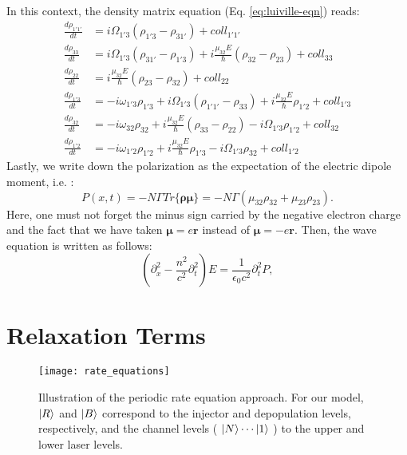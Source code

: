 \documentclass[10pt,english,fleqn]{article}%
\newcommand{\mb}[1]{\bm{#1}}
\begin{document}
\\\\
In this context, the density matrix equation (Eq. \ref{eq:luiville-eqn}) reads: 
\begin{align}
\frac{d \rho_{1'1'}}{d t} &= i\Omega_{1'3} (\rho_{1'3} - \rho_{31'}) + coll_{1'1'} \\ 
\frac{d \rho_{33}}{d t}   &= i\Omega_{1'3} (\rho_{31'} - \rho_{1'3}) + i\frac{\mu_{32} E}{\hbar} (\rho_{32}-\rho_{23}) + coll_{33} \\
\frac{d \rho_{22}}{d t}   &= i\frac{\mu_{32} E}{\hbar} (\rho_{23}-\rho_{32}) + coll_{22} \\
\frac{d \rho_{1'3}}{d t}  &= -i\omega_{1'3}\rho_{1'3} +i \Omega_{1'3}(\rho_{1'1'} - \rho_{33}) +i\frac{\mu_{32}E}{\hbar}\rho_{1'2} +coll_{1'3}  \\
\frac{d \rho_{32}}{d t}   &= -i\omega_{32}\rho_{32} +i \frac{\mu_{32}E}{\hbar}(\rho_{33}-\rho_{22}) -i\Omega_{1'3}\rho_{1'2} +coll_{32}  \\
\frac{d \rho_{1'2}}{d t}  &= -i\omega_{1'2}\rho_{1'2} +i\frac{\mu_{32}E}{\hbar}\rho_{1'3} -i\Omega_{1'3}\rho_{32} +coll_{1'2} 
\end{align}
Lastly, we write down the polarization as the expectation of the electric dipole moment, i.e. :
\begin{equation} 
P(x,t) = -N\Gamma Tr\{\mb\rho \mb\mu\} = -N\Gamma(\mu_{32}\rho_{32} + \mu_{23}\rho_{23}).
\end{equation}
 Here, one must not forget the minus sign carried by the negative electron charge and the fact that we have taken $\mb{\mu} = e\mb{r}$ instead of $\mb{\mu} = -e\mb{r}$.
Then, the wave equation is written as follows:
\begin{equation}
(\partial^2_{x} -\frac{n^2}{c^2}\partial^2_t) E = \frac{1}{\epsilon_0 c^2}\partial^2_t P,
\end{equation}

\section{Relaxation Terms}
\label{sec:relaxation-terms}
\begin{figure}[h!]
\label{fig:rate_equations}
\texttt{[image: rate\_equations]} \caption{Illustration of the periodic rate equation approach. For our model, $ \Ket {R}$  and $\Ket{B}$ correspond to the injector and depopulation levels, respectively, and the channel levels ( $\Ket{N} \cdots \Ket{1}$ ) to the upper and lower laser levels.  }
\end{figure}
\end{document}
